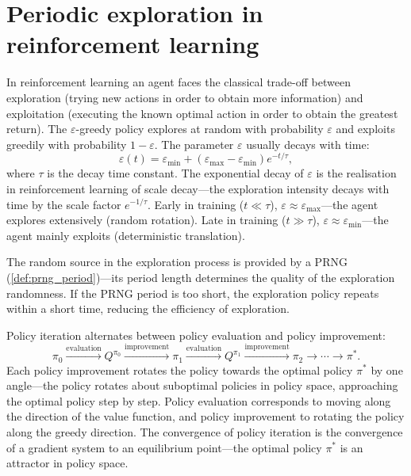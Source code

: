 \section{Periodic exploration in reinforcement learning}

\begin{definition}\label{def:exploration_exploitation}
In reinforcement learning an agent faces the classical trade-off between exploration (trying new actions in order to obtain more information) and exploitation (executing the known optimal action in order to obtain the greatest return). The $\varepsilon$-greedy policy explores at random with probability $\varepsilon$ and exploits greedily with probability $1-\varepsilon$. The parameter $\varepsilon$ usually decays with time:
\[
\varepsilon(t) = \varepsilon_{\min} + (\varepsilon_{\max} - \varepsilon_{\min}) e^{-t/\tau},
\]
where $\tau$ is the decay time constant. The exponential decay of $\varepsilon$ is the realisation in reinforcement learning of scale decay---the exploration intensity decays with time by the scale factor $e^{-1/\tau}$. Early in training ($t \ll \tau$), $\varepsilon \approx \varepsilon_{\max}$---the agent explores extensively (random rotation). Late in training ($t \gg \tau$), $\varepsilon \approx \varepsilon_{\min}$---the agent mainly exploits (deterministic translation).

The random source in the exploration process is provided by a PRNG (\cref{def:prng_period})---its period length determines the quality of the exploration randomness. If the PRNG period is too short, the exploration policy repeats within a short time, reducing the efficiency of exploration.
\end{definition}

\begin{proposition}\label{prop:policy_iteration_cycle}
Policy iteration alternates between policy evaluation and policy improvement:
\[
\pi_0 \xrightarrow{\text{evaluation}} Q^{\pi_0} \xrightarrow{\text{improvement}} \pi_1 \xrightarrow{\text{evaluation}} Q^{\pi_1} \xrightarrow{\text{improvement}} \pi_2 \to \cdots \to \pi^*.
\]
Each policy improvement rotates the policy towards the optimal policy $\pi^*$ by one angle---the policy rotates about suboptimal policies in policy space, approaching the optimal policy step by step. Policy evaluation corresponds to moving along the direction of the value function, and policy improvement to rotating the policy along the greedy direction. The convergence of policy iteration is the convergence of a gradient system to an equilibrium point---the optimal policy $\pi^*$ is an attractor in policy space.
\end{proposition}

